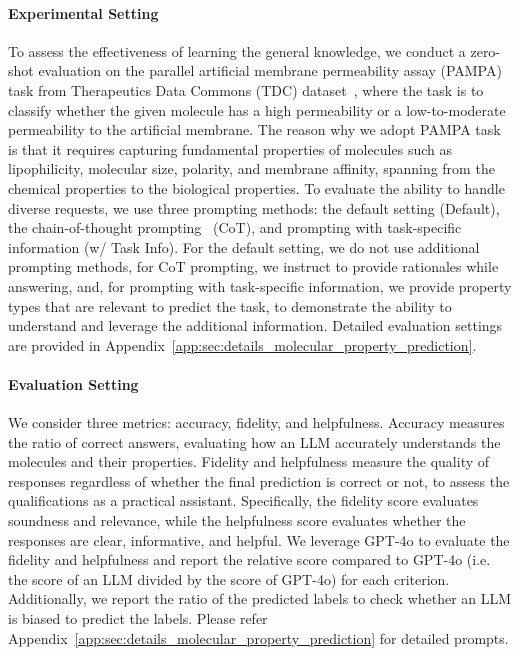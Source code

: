 \paragraph{Experimental Setting}
To assess the effectiveness of learning the general knowledge, we conduct a zero-shot evaluation on the parallel artificial membrane permeability assay (PAMPA) task from Therapeutics Data Commons (TDC) dataset~\cite{velez2024tdc}, where the task is to classify whether the given molecule has a high permeability or a low-to-moderate permeability to the artificial membrane. The reason why we adopt PAMPA task is that it requires capturing fundamental properties of molecules such as lipophilicity, molecular size, polarity, and membrane affinity, spanning from the chemical properties to the biological properties. To evaluate the ability to handle diverse requests, we use three prompting methods: the default setting (Default), the chain-of-thought prompting~\cite{wei2022CoT} (CoT), and prompting with task-specific information (w/ Task Info). For the default setting, we do not use additional prompting methods, for CoT prompting, we instruct to provide rationales while answering, and, for prompting with task-specific information, we provide property types that are relevant to predict the task, to demonstrate the ability to understand and leverage the additional information. Detailed evaluation settings are provided in Appendix~\ref{app:sec:details_molecular_property_prediction}.




\vspace{-0.05in}
\paragraph{Evaluation Setting} We consider three metrics: accuracy, fidelity, and helpfulness. Accuracy measures the ratio of correct answers, evaluating how an LLM accurately understands the molecules and their properties. Fidelity and helpfulness measure the quality of responses regardless of whether the final prediction is correct or not, to assess the qualifications as a practical assistant. Specifically, the fidelity score evaluates soundness and relevance, while the helpfulness score evaluates whether the responses are clear, informative, and helpful. We leverage GPT-4o to evaluate the fidelity and helpfulness and report the relative score compared to GPT-4o (i.e. the score of an LLM divided by the score of GPT-4o) for each criterion. Additionally, we report the ratio of the predicted labels to check whether an LLM is biased to predict the labels. Please refer Appendix~\ref{app:sec:details_molecular_property_prediction} for detailed prompts.

